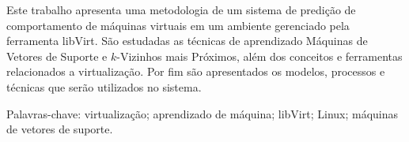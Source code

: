 \documentclass[font=plain,chapter=TITLE,section=Title,espaco=duplo,tocpage=plain,appendix=Name,floatnumber=continuous]{abnt}
\begin{document}


\UTPCapa
\UTPFalsaFolhaDeRosto
\UTPFolhaDeRosto

\begin{resumo}
Este trabalho apresenta uma metodologia de um sistema de predição de
comportamento de máquinas virtuais em um ambiente gerenciado pela
ferramenta libVirt. São estudadas as técnicas de aprendizado Máquinas de
Vetores de Suporte e $k$-Vizinhos mais Próximos, além dos conceitos e
ferramentas relacionados a virtualização. Por fim são apresentados os
modelos, processos e técnicas que serão utilizados no sistema.

Palavras-chave: virtualização; aprendizado de máquina; libVirt; Linux;
máquinas de vetores de suporte.
\end{resumo}

\listoffigures
\listadequadros
\sumario


















\end{document}
